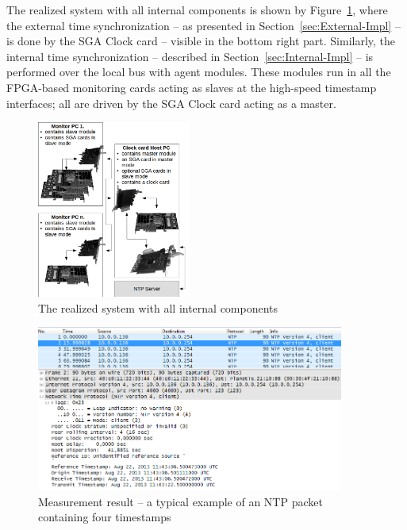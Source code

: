\documentclass[journal]{IEEEtran}
\begin{document}
The realized system with all internal components is shown by Figure~\ref{fig:realized-system}, where the external time
synchronization -- as presented in Section~\ref{sec:External-Impl} -- is done by the SGA Clock card -- visible in the
bottom right part. Similarly, the internal time synchronization -- described in Section~\ref{sec:Internal-Impl} --
is performed over the local bus with agent modules. These modules run in all the FPGA-based monitoring cards acting as slaves at the
high-speed timestamp interfaces; all are driven by the SGA Clock card acting as a master.

\begin{figure}[H]
    \centering
    \includegraphics[width=0.45\textwidth]{figures_raw/clock_architecture.png}
    \caption{The realized system with all internal components}
    \label{fig:realized-system}
\end{figure}

\begin{figure}[!htb]
    \centering
    \includegraphics[width=0.9\textwidth]{figures_raw/pcap-NTP.png}
    \caption{Measurement result -- a typical example of an NTP packet containing four timestamps}
    \label{fig:pcap-NTP}
\end{figure}
\end{document}
